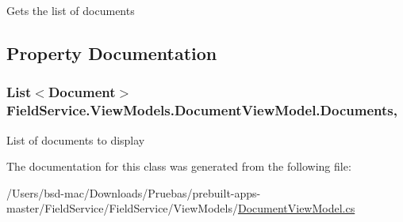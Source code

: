 Gets the list of documents 



\subsection{Property Documentation}
\hypertarget{class_field_service_1_1_view_models_1_1_document_view_model_a808fe9edb51b193c727cce909135ea7c}{
\subsubsection[{Documents}]{\setlength{\rightskip}{0pt plus 5cm}List$<${\bf Document}$>$ Field\+Service.\+View\+Models.\+Document\+View\+Model.\+Documents\hspace{0.3cm}{\ttfamily [get]}, {\ttfamily [set]}}}\label{class_field_service_1_1_view_models_1_1_document_view_model_a808fe9edb51b193c727cce909135ea7c}


List of documents to display 



The documentation for this class was generated from the following file\+:\begin{DoxyCompactItemize}
\item 
/\+Users/bsd-\/mac/\+Downloads/\+Pruebas/prebuilt-\/apps-\/master/\+Field\+Service/\+Field\+Service/\+View\+Models/\hyperlink{_view_models_2_document_view_model_8cs}{Document\+View\+Model.\+cs}\end{DoxyCompactItemize}
